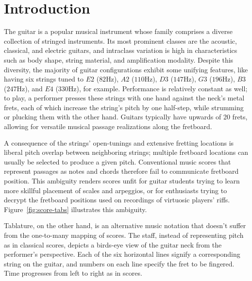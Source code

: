 \documentclass[12pt]{cmuthesis}
\begin{document}
\chapter{Introduction} 
The guitar is a popular musical instrument whose family comprises a diverse collection of stringed instruments. Its most prominent classes are the acoustic, classical, and electric guitars, and intraclass variation is high in characteristics such as body shape, string material, and amplification modality. Despite this diversity, the majority of guitar configurations exhibit some unifying features, like having six strings tuned to $E2$ ($82$Hz), $A2$ ($110$Hz), $D3$ ($147$Hz), $G3$ ($196$Hz), $B3$ ($247$Hz), and $E4$ ($330$Hz), for example. Performance is relatively constant as well; to play, a performer presses these strings with one hand against the neck's metal frets, each of which increase the string's pitch by one half-step, while strumming or plucking them with the other hand. Guitars typically have upwards of 20 frets, allowing for versatile musical passage realizations along the fretboard.

A consequence of the strings' open-tunings and extensive fretting locations is liberal pitch overlap between neighboring strings; multiple fretboard locations can usually be selected to produce a given pitch. Conventional music scores that represent passages as notes and chords therefore fail to communicate fretboard position. This ambiguity renders scores unfit for guitar students trying to learn more skillful placement of scales and arpeggios, or for enthusiasts trying to decrypt the fretboard positions used on recordings of virtuosic players' riffs. Figure~\ref{fig:score-tabs} illustrates this ambiguity.

Tablature, on the other hand, is an alternative music notation that doesn't suffer from the one-to-many mapping of scores. The staff, instead of representing pitch as in classical scores, depicts a birds-eye view of the guitar neck from the performer's perspective. Each of the six horizontal lines signify a corresponding string on the guitar, and numbers on each line specify the fret to be fingered. Time progresses from left to right as in scores. 
\end{document}
